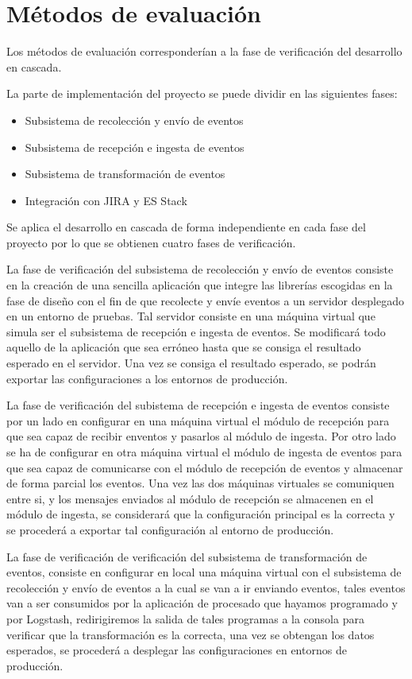 \section{Métodos de evaluación}

Los métodos de evaluación corresponderían a la fase de verificación del desarrollo en cascada.

La parte de implementación del proyecto se puede dividir en las siguientes fases:

\begin{itemize}
	\item Subsistema de recolección y envío de eventos
	\item Subsistema de recepción e ingesta de eventos
	\item Subsistema de transformación de eventos
	\item Integración con JIRA y ES Stack
\end{itemize}

Se aplica el desarrollo en cascada de forma independiente en cada fase del proyecto por lo que se obtienen cuatro fases de verificación.

La fase de verificación del subsistema de recolección y envío de eventos consiste en la creación de una sencilla aplicación que integre las librerías escogidas en la fase de diseño con el fin de que recolecte y envíe eventos a un servidor desplegado en un entorno de pruebas. Tal servidor consiste en una máquina virtual que simula ser el subsistema de recepción e ingesta de eventos. Se modificará todo aquello de la aplicación que sea erróneo hasta que se consiga el resultado esperado en el servidor. Una vez se consiga el resultado esperado, se podrán exportar las configuraciones a los entornos de producción.

La fase de verificación del subistema de recepción e ingesta de eventos consiste por un lado en configurar en una máquina virtual el módulo de recepción para que sea capaz de recibir enventos y pasarlos al módulo de ingesta. Por otro lado se ha de configurar en otra máquina virtual el módulo de ingesta de eventos para que sea capaz de comunicarse con el módulo de recepción de eventos y almacenar de forma parcial los eventos. Una vez las dos máquinas virtuales se comuniquen entre si, y los mensajes enviados al módulo de recepción se almacenen en el módulo de ingesta, se considerará que la configuración principal es la correcta y se procederá a exportar tal configuración al entorno de producción.

La fase de verificación de verificación del subsistema de transformación de eventos, consiste en configurar en local una máquina virtual con el subsistema de recolección y envío de eventos a la cual se van a ir enviando eventos, tales eventos van a ser consumidos por la aplicación de procesado que hayamos programado y por Logstash, redirigiremos la salida de tales programas a la consola para verificar que la transformación es la correcta, una vez se obtengan los datos esperados, se procederá a desplegar las configuraciones en entornos de producción.

